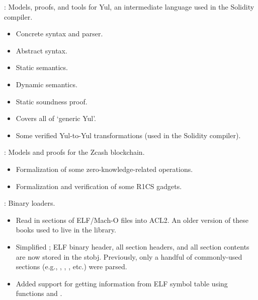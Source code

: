 \begin{frame}

\newlibtitle

:
Models, proofs, and tools for Yul,
an intermediate language used in the Solidity compiler.
\begin{itemize}
\item Concrete syntax and parser.
\item Abstract syntax.
\item Static semantics.
\item Dynamic semantics.
\item Static soundness proof.
\item Covers all of `generic Yul'.
\item Some verified Yul-to-Yul transformations (used in the Solidity compiler).
\end{itemize}

\end{frame}


\begin{frame}

\newlibtitle

:
Models and proofs for the Zcash blockchain.
\begin{itemize}
\item Formalization of some zero-knowledge-related operations.
\item Formalization and verification of some R1CS gadgets.
\end{itemize}
\end{frame}


\begin{frame}

\newlibtitle

:
Binary loaders.
\begin{itemize}
\item Read in sections of ELF/Mach-O files into ACL2. An older version
      of these books used to live in the  library.
\item Simplified ; ELF binary header, all section
      headers, and all section contents are now stored in the 
      stobj. Previously, only a handful of commonly-used sections (e.g.,
      , , , etc.) were parsed.
\item Added support for getting information from ELF symbol table
      using functions  and
      .
\end{itemize}
\end{frame}

